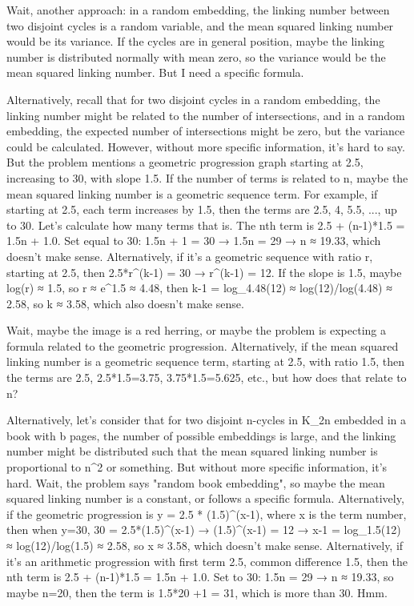 Wait, another approach: in a random embedding, the linking number between two disjoint cycles is a random variable, and the mean squared linking number would be its variance. If the cycles are in general position, maybe the linking number is distributed normally with mean zero, so the variance would be the mean squared linking number. But I need a specific formula.

Alternatively, recall that for two disjoint cycles in a random embedding, the linking number might be related to the number of intersections, and in a random embedding, the expected number of intersections might be zero, but the variance could be calculated. However, without more specific information, it's hard to say. But the problem mentions a geometric progression graph starting at 2.5, increasing to 30, with slope 1.5. If the number of terms is related to n, maybe the mean squared linking number is a geometric sequence term. For example, if starting at 2.5, each term increases by 1.5, then the terms are 2.5, 4, 5.5, ..., up to 30. Let's calculate how many terms that is. The nth term is 2.5 + (n-1)*1.5 = 1.5n + 1.0. Set equal to 30: 1.5n + 1 = 30 → 1.5n = 29 → n ≈ 19.33, which doesn't make sense. Alternatively, if it's a geometric sequence with ratio r, starting at 2.5, then 2.5*r^(k-1) = 30 → r^(k-1) = 12. If the slope is 1.5, maybe log(r) ≈ 1.5, so r ≈ e^1.5 ≈ 4.48, then k-1 = log_4.48(12) ≈ log(12)/log(4.48) ≈ 2.58, so k ≈ 3.58, which also doesn't make sense.

Wait, maybe the image is a red herring, or maybe the problem is expecting a formula related to the geometric progression. Alternatively, if the mean squared linking number is a geometric sequence term, starting at 2.5, with ratio 1.5, then the terms are 2.5, 2.5*1.5=3.75, 3.75*1.5=5.625, etc., but how does that relate to n?

Alternatively, let's consider that for two disjoint n-cycles in K_{2n} embedded in a book with b pages, the number of possible embeddings is large, and the linking number might be distributed such that the mean squared linking number is proportional to n^2 or something. But without more specific information, it's hard. Wait, the problem says "random book embedding", so maybe the mean squared linking number is a constant, or follows a specific formula. Alternatively, if the geometric progression is y = 2.5 * (1.5)^(x-1), where x is the term number, then when y=30, 30 = 2.5*(1.5)^(x-1) → (1.5)^(x-1) = 12 → x-1 = log_{1.5}(12) ≈ log(12)/log(1.5) ≈ 2.58, so x ≈ 3.58, which doesn't make sense. Alternatively, if it's an arithmetic progression with first term 2.5, common difference 1.5, then the nth term is 2.5 + (n-1)*1.5 = 1.5n + 1.0. Set to 30: 1.5n = 29 → n ≈ 19.33, so maybe n=20, then the term is 1.5*20 +1 = 31, which is more than 30. Hmm.

